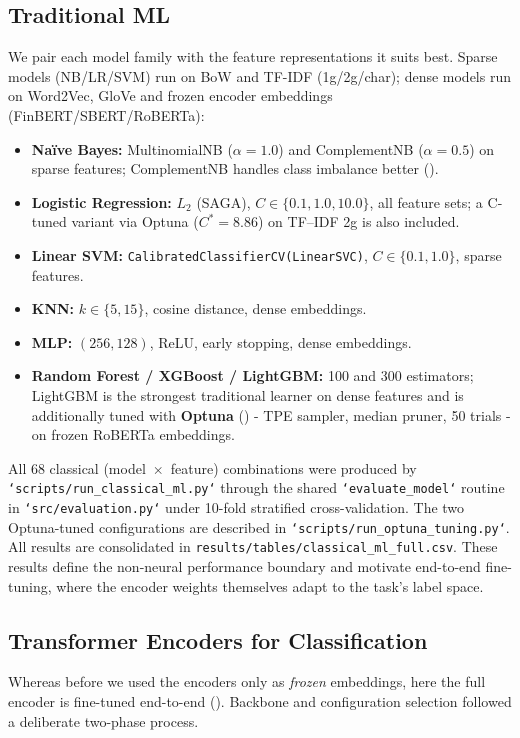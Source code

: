 \documentclass[11pt,a4paper]{article}
\newcommand{\tH}[1]{\textcolor{maincolor}{\textbf{#1}}}
\begin{document}
\subsection{Traditional ML}
We pair each model family with the feature representations it suits best.
Sparse models (NB/LR/SVM) run on BoW and TF-IDF (1g/2g/char);
dense models run on Word2Vec, GloVe and frozen encoder embeddings (FinBERT/SBERT/RoBERTa):

\begin{itemize}
  \item \tH{Na\"ive Bayes:} MultinomialNB ($\alpha=1.0$) and ComplementNB ($\alpha=0.5$)
    on sparse features; ComplementNB handles class imbalance better (\cite{rennie2003tackling}).
  \item \tH{Logistic Regression:} $L_2$ (SAGA), $C \in \{0.1, 1.0, 10.0\}$, all feature
    sets; a C-tuned variant via Optuna ($C^*=8.86$) on TF--IDF 2g is also included.
  \item \tH{Linear SVM:} \texttt{CalibratedClassifierCV(LinearSVC)}, $C \in \{0.1, 1.0\}$,
    sparse features.
  \item \tH{KNN:} $k \in \{5, 15\}$, cosine distance, dense embeddings.
  \item \tH{MLP:} $(256,128)$, ReLU, early stopping, dense embeddings.
  \item \tH{Random Forest / XGBoost / LightGBM:} 100 and 300 estimators; LightGBM is the
    strongest traditional learner on dense features and is additionally tuned with
    \textbf{Optuna} (\cite{akiba2019optuna}) - TPE sampler, median pruner, 50 trials - on
    frozen RoBERTa embeddings.
\end{itemize}

All 68 classical (model~$\times$~feature) combinations were produced by \texttt{`scripts/run\_classical\_ml.py`} through the shared \texttt{`evaluate\_model`} routine in \texttt{`src/evaluation.py`} under 10-fold stratified cross-validation. The two Optuna-tuned configurations are described in \texttt{`scripts/run\_optuna\_tuning.py`}. All results are  consolidated in \texttt{results/tables/classical\_ml\_full.csv}. These results define the non-neural performance boundary and motivate end-to-end fine-tuning, where the encoder weights themselves adapt to the task's label space.

\subsection{Transformer Encoders for Classification}
\label{sec:encoders}
Whereas before we used the encoders only as \emph{frozen} embeddings, here the full
encoder is fine-tuned end-to-end (\cite{devlin2019bert}). Backbone and configuration selection followed a deliberate two-phase process.
\end{document}
